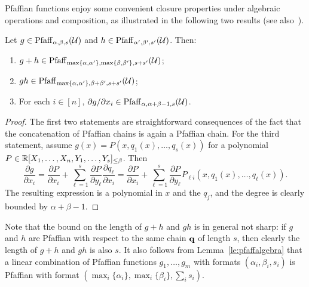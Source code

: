
Pfaffian functions enjoy some convenient closure properties under algebraic operations and composition, as illustrated in the following two results (see also~\cite[Proposition 1.8]{zell2003quantitative}).

\begin{lemma}\label{le:pfaffalgebra}
Let $g\in \mathrm{Pfaff}_{\alpha, \beta, s}(\mathcal{U})$ and $h\in \mathrm{Pfaff}_{\alpha', \beta', s'}(\mathcal{U})$. Then: 
\begin{enumerate}
\item $g + h \in \mathrm{Pfaff}_{\max\{\alpha,\alpha'\}, \max\{\beta,\beta'\},s+s'}(\mathcal{U})$;
\item $gh \in \mathrm{Pfaff}_{\max\{\alpha,\alpha'\}, \beta+\beta',s+s'}(\mathcal{U})$;
\item For each $i\in [n]$, $\partial g/\partial x_i \in \mathrm{Pfaff}_{\alpha,\alpha+\beta-1,s}(\mathcal{U})$. 
\end{enumerate}
\end{lemma}

\begin{proof}
The first two statements are straightforward consequences of the fact that the concatenation of Pfaffian chains is again a Pfaffian chain. For the third statement, assume $g(x)=P(x,q_1(x),\dots,q_s(x))$ for a polynomial $P\in \mathbb{R}[X_1,\dots,X_n,Y_1,\dots,Y_s]_{\leq \beta}$. Then
\begin{equation*}
  \frac{\partial g}{\partial x_i} = \frac{\partial P}{\partial x_i}+\sum_{\ell=1}^s \frac{\partial P}{\partial y_\ell}\frac{\partial q_\ell}{\partial x_i}= \frac{\partial P}{\partial x_i}+\sum_{\ell=1}^s \frac{\partial P}{\partial y_\ell}P_{\ell i}(x,q_1(x),\dots,q_\ell(x)).
\end{equation*}
The resulting expression is a polynomial in $x$ and the $q_j$, and the degree is clearly bounded by $\alpha+\beta-1$.
\end{proof}

\begin{remark}\label{re:1}
Note that the bound on the length of $g+h$ and $gh$ is in general not sharp: if $g$ and $h$ are Pfaffian with respect to the same chain $\mathbf{q}$ of length $s$, then clearly the length of $g+h$ and $gh$ is also $s$. It also follows from Lemma~\ref{le:pfaffalgebra} that a linear combination of Pfaffian functions $g_1,\dots,g_m$ with formats $(\alpha_i,\beta_i,s_i)$ is Pfaffian with format $(\max_i \{\alpha_i\},\max_i\{\beta_i\}, \sum_i s_i)$. 
\end{remark}

